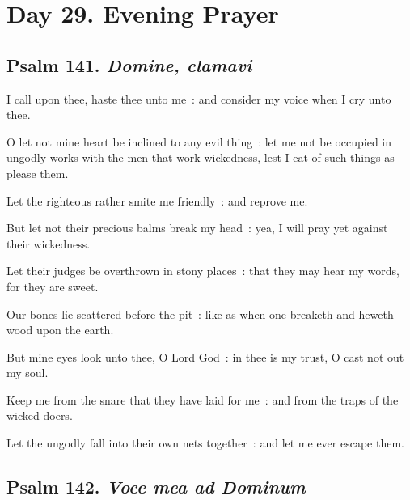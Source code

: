 \section*{Day 29. Evening Prayer}

\subsection{Psalm 141. \textit{Domine, clamavi}}


 I call upon thee, haste thee unto me~: and consider my voice when I cry unto thee.\par
{}
O let not mine heart be inclined to any evil thing~: let me not be occupied in ungodly works with the men that work wickedness, lest I eat of such things as please them.\par
{}Let the righteous rather smite me friendly~: and reprove me.\par
{}But let not their precious balms break my head~: yea, I will pray yet against their wickedness.\par
{}Let their judges be overthrown in stony places~: that they may hear my words, for they are sweet.\par
{}Our bones lie scattered before the pit~: like as when one breaketh and heweth wood upon the earth.\par
{}But mine eyes look unto thee, O Lord God~: in thee is my trust, O cast not out my soul.\par
{}Keep me from the snare that they have laid for me~: and from the traps of the wicked doers.\par
{}Let the ungodly fall into their own nets together~: and let me ever escape them.\par


\clearpage
\subsection{Psalm 142. \textit{Voce mea ad Dominum}}

